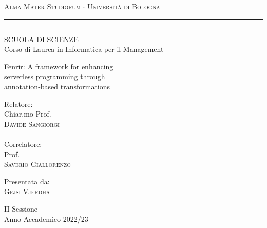 \begin{otherlanguage}{italian}
\begin{titlepage}
\begin{center}
{{\Large{\textsc{Alma Mater Studiorum $\cdot$ Universit\`a di
Bologna}}}} \rule[0.1cm]{15.8cm}{0.1mm}
\rule[0.5cm]{15.8cm}{0.6mm}
{\small{ SCUOLA DI SCIENZE\\
Corso di Laurea in Informatica per il Management}}
\end{center}
\vspace{15mm}
\begin{center}
{\LARGE{ Fenrir: A framework for enhancing  }}\\ %
\vspace{3mm}
{\LARGE{ serverless programming through  }}\\
\vspace{3mm}
{\LARGE{ annotation-based transformations }}\\
\end{center}
\vspace{40mm}
\par
\noindent
\begin{minipage}[t]{0.47\textwidth}
{\large{ Relatore:\\
Chiar.mo Prof.\\
\textsc{Davide Sangiorgi}\\\\
Correlatore:\\
Prof.\\
\textsc{Saverio Giallorenzo}}}
\end{minipage}
\hfill
\begin{minipage}[t]{0.47\textwidth}\raggedleft
{\large{ Presentata da:\\
\textsc{Gejsi Vjerdha}}}
\end{minipage}
\vspace{20mm}
\begin{center}
{\large{ II Sessione\\
Anno Accademico 2022/23 }}%
\end{center}
\end{titlepage}
\end{otherlanguage}
